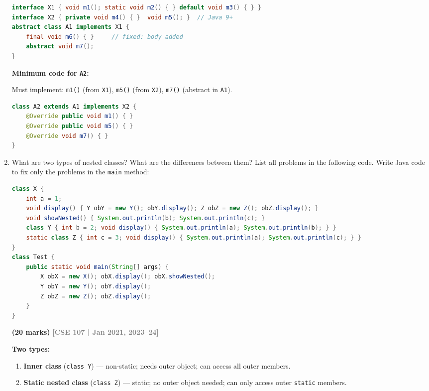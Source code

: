 \documentclass[12pt,a3paper]{article}
\newcommand{\yr}[1]{\hfill\textcolor{gray}{\small\textbf{[#1]}}}
\newcommand{\mk}[1]{\textcolor{orange!70!black}{\small\textbf{(#1 marks)}}}
\begin{document}
\begin{enumerate}
\begin{tcolorbox}
\begin{lstlisting}[language=Java]
interface X1 { void m1(); static void m2() { } default void m3() { } }
interface X2 { private void m4() { }  void m5(); }  // Java 9+
abstract class A1 implements X1 {
    final void m6() { }     // fixed: body added
    abstract void m7();
}
\end{lstlisting}

\textbf{Minimum code for \texttt{A2}:}

Must implement: \texttt{m1()} (from \texttt{X1}),
\texttt{m5()} (from \texttt{X2}), \texttt{m7()} (abstract in \texttt{A1}).

\begin{lstlisting}[language=Java]
class A2 extends A1 implements X2 {
    @Override public void m1() { }
    @Override public void m5() { }
    @Override void m7() { }
}
\end{lstlisting}

\end{tcolorbox}

\item What are two types of nested classes? What are the differences between them? List all problems in the following code. Write Java code to fix only the problems in the \texttt{main} method:
\begin{lstlisting}[language=Java]
class X {
    int a = 1;
    void display() { Y obY = new Y(); obY.display(); Z obZ = new Z(); obZ.display(); }
    void showNested() { System.out.println(b); System.out.println(c); }
    class Y { int b = 2; void display() { System.out.println(a); System.out.println(b); } }
    static class Z { int c = 3; void display() { System.out.println(a); System.out.println(c); } }
}
class Test {
    public static void main(String[] args) {
        X obX = new X(); obX.display(); obX.showNested();
        Y obY = new Y(); obY.display();
        Z obZ = new Z(); obZ.display();
    }
}
\end{lstlisting}
\mk{20}
\yr{CSE 107 | Jan 2021, 2023--24}

\begin{tcolorbox}[enhanced,breakable,ansbox,
  colback=cD!4,colframe=cD,boxrule=0.8pt,arc=5pt,
  title={\textbf{Answer --- Nested Class Types, Differences \& Fixed \texttt{main}}},
  fonttitle=\bfseries\color{white},colbacktitle=cD]

\textbf{Two types:}
\begin{enumerate}[label=\textbf{\arabic*.}]
  \item \textbf{Inner class} (\texttt{class Y}) --- non-static; needs
    outer object; can access all outer members.
  \item \textbf{Static nested class} (\texttt{class Z}) --- static;
    no outer object needed; can only access outer \texttt{static} members.
\end{enumerate}


\end{tcolorbox}
\end{enumerate}
\end{document}
